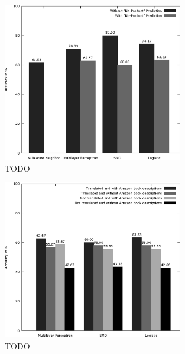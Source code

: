 \begin{figure}
	\label{fig:product_eval}
	\begin{center}
		\includegraphics[width=0.7\textwidth]{figures/product_eval.eps}
	\end{center}
	\caption{TODO}
\end{figure}

\begin{figure}
	\label{fig:product_translate_amazon_with_none}
	\begin{center}
		\includegraphics[width=0.7\textwidth]{figures/product_translate_amazon_with_none.eps}
	\end{center}
	\caption{TODO}
\end{figure}

